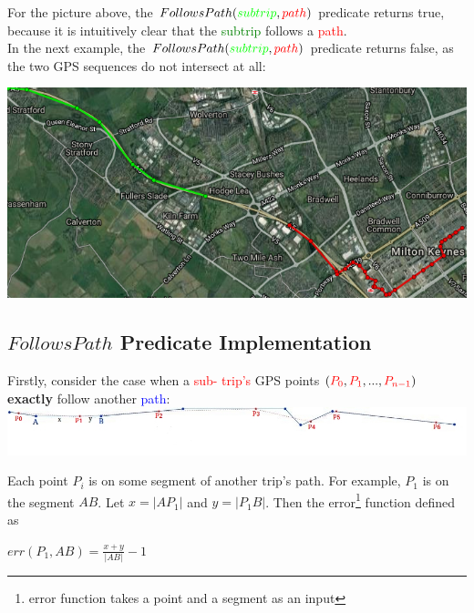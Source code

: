 \documentclass[12pt,a4paper,oneside,openright]{report}
\begin{document}
For the picture above, the $FollowsPath(\textcolor{green}{subtrip}, \textcolor{red}{path})$ 
predicate returns true, because it is intuitively clear that the \textcolor{green}{subtrip}
follows a \textcolor{red}{path}. \\

In the next example, the $FollowsPath(\textcolor{green}{subtrip}, \textcolor{red}{path})$
predicate returns false, as the two GPS sequences do not intersect at all:

\includegraphics[width=\textwidth]{figs/not_follows_path.png}

\:

\subsection{$FollowsPath$ Predicate Implementation}

Firstly, consider the case when a \textcolor{red}{sub- trip's} GPS points
$(\textcolor{red}{P_0}, \textcolor{red}{P_1}, ..., \textcolor{red}{P_{n-1}})$
\textbf{exactly} follow another \textcolor{blue}{path}: \\

\includegraphics[width=\textwidth]{figs/follows_exactly.jpg}

Each point $P_i$ is on some segment of another trip's path.
For example, $P_1$ is on the segment $AB$.
Let $x = |AP_1|$ and $y = |P_1B|$. Then the
error\footnote{error function takes a point and a segment as an input} function
defined as \\

\begin{centering}
$err(P_1, AB) = \frac{x + y}{|AB|} - 1$ \\
\end{centering}
\end{document}
